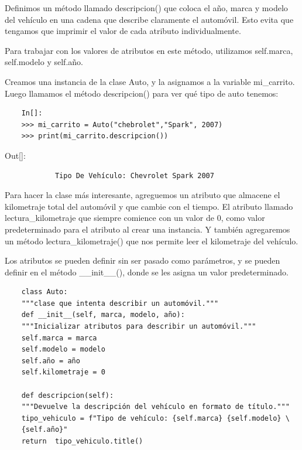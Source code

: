 {Definimos un método llamado {\ttfamily descripcion()}  que coloca el año, marca y modelo del vehículo en una cadena que describe claramente el automóvil. Esto evita que tengamos que imprimir el valor de cada atributo individualmente. 

Para trabajar con los valores de atributos en este método, utilizamos {\ttfamily self.marca}, {\ttfamily self.modelo} y {\ttfamily self.año}.

Creamos una instancia de la clase {\ttfamily Auto}, y la asignamos a la variable {\ttfamily mi\_carrito}. Luego llamamos el método {\ttfamily descripcion()} para ver qué tipo de auto tenemos:

\begin{lstlisting}
	In[]:
	>>> mi_carrito = Auto("chebrolet","Spark", 2007)
	>>> print(mi_carrito.descripcion())
\end{lstlisting}
{\ttfamily\scriptsize\noindent Out[]:\vspace{-0.3cm}	
	{\color{blue} 	
		\begin{verbatim}
			Tipo De Vehículo: Chevrolet Spark 2007 
		\end{verbatim}
}}

Para hacer la clase más interesante, agreguemos un atributo que almacene el kilometraje total del automóvil y  que cambie con el tiempo. El atributo llamado {\ttfamily lectura\_kilometraje} que siempre comience con un valor de 0, como valor predeterminado para el atributo al crear una instancia.  Y también agregaremos un método {\ttfamily lectura\_kilometraje()} que nos permite leer el kilometraje del vehículo.

Los atributos se pueden definir sin ser pasado como parámetros, y se pueden definir en el método {\ttfamily \_\!\_init\_\!\_()}, donde se les asigna un valor predeterminado.

\hspace{-2.0cm}{\ttfamily \scriptsize auto.py}\vspace{-0.5cm}
\begin{lstlisting}
	class Auto:
	"""clase que intenta describir un automóvil."""
	def __init__(self, marca, modelo, año):
	"""Inicializar atributos para describir un automóvil."""
	self.marca = marca
	self.modelo = modelo
	self.año = año
	self.kilometraje = 0
	
	def descripcion(self):
	"""Devuelve la descripción del vehículo en formato de título."""
	tipo_vehiculo = f"Tipo de vehículo: {self.marca} {self.modelo} \
	{self.año}"
	return  tipo_vehiculo.title()
	

\end{lstlisting}}
